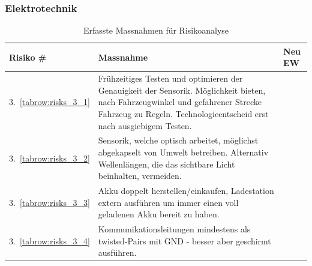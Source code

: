 \documentclass[main.tex]{subfiles} %
\begin{document}

\subsubsection*{Elektrotechnik}

\begin{table}[H]
    \begin{tabularx}{\textwidth}{|>{\centering\arraybackslash}p{2cm}|>{\raggedright\arraybackslash}X|>{\centering\arraybackslash}p{0.75cm}|}
        \hline
        \textbf{Risiko \#}        & \textbf{Massnahme}
                                  & \textbf{Neu EW}                                                                                                                                                                                        \\

        \hline
        \rowcolor{yellow!30}
        3.~\ref{tabrow:risks_3_1} & Frühzeitiges Testen und optimieren der Genauigkeit der Sensorik. Möglichkeit bieten, nach Fahrzeugwinkel und gefahrener Strecke Fahrzeug zu Regeln. Technologieentscheid erst nach ausgiebigem Testen.
                                  & 2                                                                                                                                                                                                      \\

        \hline
        \rowcolor{yellow!30}
        3.~\ref{tabrow:risks_3_2} & Sensorik, welche optisch arbeitet, möglichst abgekapselt von Umwelt betreiben. Alternativ Wellenlängen, die das sichtbare Licht beinhalten, vermeiden.
                                  & 3                                                                                                                                                                                                      \\

        \hline
        \rowcolor{green!30}
        3.~\ref{tabrow:risks_3_3} & Akku doppelt herstellen/einkaufen, Ladestation extern ausführen um immer einen voll geladenen Akku bereit zu haben.
                                  & 1                                                                                                                                                                                                      \\

        \hline
        \rowcolor{green!30}
        3.~\ref{tabrow:risks_3_4} & Kommunikationsleitungen mindestens als twisted-Pairs mit GND - besser aber geschirmt ausführen.
                                  & 1                                                                                                                                                                                                      \\

        \hline

    \end{tabularx}
    \caption{Erfasste Massnahmen für Risikoanalyse}~\label{tab:Erfasste_Massnahmen}
\end{table}
\end{document}
